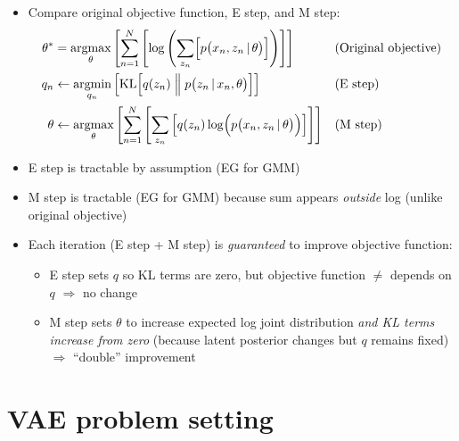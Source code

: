 \documentclass{article}
\begin{document}
\begin{itemize}
    \item Compare original objective function, E step, and M step:
    \begin{align}
        \theta^* &= \underset{\theta}{\text{argmax}}\left[ \sum_{n=1}^N \left[ \log\left( \sum_{z_n} \Bigl[ p\bigl(x_n, z_n \,\vert\, \theta\bigr) \Bigr] \right) \right] \right] && \text{(Original objective)} \\
        q_n &\leftarrow \underset{q_n}{\text{argmin}}\left[ \text{KL}\Bigl[ q(z_n) \Bigm\Vert p\bigl(z_n \,\vert\, x_n, \theta\bigr) \Bigr] \right] && \text{(E step)} \\
        \theta &\leftarrow \underset{\theta}{\text{argmax}}\left[ \sum_{n=1}^N \left[ \sum_{z_n}\left[ q(z_n) \log\Bigl( p\bigl(x_n, z_n \,\vert\, \theta\bigr) \Bigr) \right] \right] \right] && \text{(M step)}
    \end{align}
    \item E step is tractable by assumption (EG for GMM)
    \item M step is tractable (EG for GMM) because sum appears \emph{outside} log (unlike original objective)
    \item Each iteration (E step + M step) is \emph{guaranteed} to improve objective function:
    \begin{itemize}
        \item E step sets $q$ so KL terms are zero, but objective function $\ne$ depends on $q$ $\Rightarrow$ no change
        \item M step sets $\theta$ to increase expected log joint distribution \emph{and KL terms increase from zero} (because latent posterior changes but $q$ remains fixed) $\Rightarrow$ ``double'' improvement
    \end{itemize}
\end{itemize}

\newpage
\section{VAE problem setting}
\end{document}
